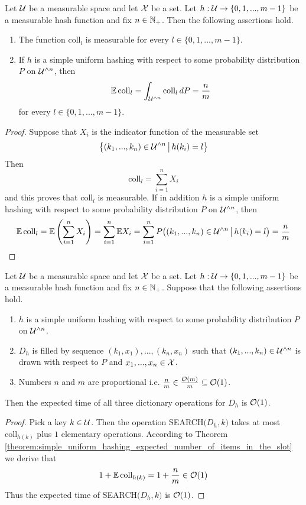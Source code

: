 \begin{theorem}\label{theorem:simple_uniform_hashing_expected_number_of_items_in_the_slot}
Let ${\mathcal U}$ be a measurable space and let ${\mathcal X}$ be a set. Let $h:{\mathcal U}\rightarrow \{0,1,...,m-1\}$ be a measurable hash function and fix $n\in {\mathbb N}_+$. Then the following assertions hold.
\begin{enumerate}[label=\emph{\textbf{(\arabic*)}}, leftmargin=*]
\item The function $\mathrm{coll}_l$ is measurable for every $l\in \{0,1,...,m-1\}$.
\item If $h$ is a simple uniform hashing with respect to some probability distribution $P$ on ${\mathcal U}^{\wedge n}$, then
$$\mathbb{E}\,\mathrm{coll}_l = \int_{{\mathcal U}^{\wedge n}}\mathrm{coll}_l\,dP = \frac{n}{m}$$
for every $l\in \{0,1,...,m-1\}$.
\end{enumerate}
\end{theorem}
\begin{proof}
Suppose that $X_i$ is the indicator function of the measurable set 
$$\big\{(k_1,...,k_n)\in {\mathcal U}^{\wedge n}\,\big|\,h(k_i) = l\big\}$$
Then
$$\mathrm{coll}_l = \sum_{i=1}^nX_i$$
and this proves that $\mathrm{coll}_l$ is measurable. If in addition $h$ is a simple uniform hashing with respect to some probability distribution $P$ on ${\mathcal U}^{\wedge n}$, then
$$\mathbb{E}\,\mathrm{coll}_l = \mathbb{E}\left(\sum_{i=1}^nX_i\right) = \sum_{i=1}^n\mathbb{E}X_i = \sum_{i=1}^nP\big((k_1,...,k_n)\in {\mathcal U}^{\wedge n}\,\big|\,h(k_i) = l\big) = \frac{n}{m}$$
\end{proof}

\begin{corollary}\label{corollary:hashing_with_chaining_expected_operations_under_simple_uniform_hashing}
Let ${\mathcal U}$ be a measurable space and let ${\mathcal X}$ be a set. Let $h:{\mathcal U}\rightarrow \{0,1,...,m-1\}$ be a measurable hash function and fix $n\in {\mathbb N}_+$. Suppose that the following assertions hold.
\begin{enumerate}[label=\emph{\textbf{(\arabic*)}}, leftmargin=*]
\item $h$ is a simple uniform hashing with respect to some probability distribution $P$ on ${\mathcal U}^{\wedge n}$.
\item $D_h$ is filled by sequence $(k_1,x_1),...,(k_n,x_n)$ such that $(k_1,...,k_n)\in {\mathcal U}^{\wedge n}$ is drawn with respect to $P$ and $x_1,...,x_n\in {\mathcal X}$.
\item Numbers $n$ and $m$ are proportional i.e. $\frac{n}{m} \in \frac{{\mathcal O}(m)}{m}\subseteq {\mathcal O}(1)$.
\end{enumerate}
Then the expected time of all three dictionary operations for $D_h$ is ${\mathcal O}(1)$.
\end{corollary}
\begin{proof}
Pick a key $k\in {\mathcal U}$. Then the operation \textrm{SEARCH}$\big(D_h,k\big)$ takes at most $\mathrm{coll}_{h(k)}$ plus $1$ elementary operations. According to Theorem \ref{theorem:simple_uniform_hashing_expected_number_of_items_in_the_slot} we derive that
$$1 + \mathbb{E}\,\mathrm{coll}_{h(k)} = 1 + \frac{n}{m} \in {\mathcal O}(1)$$
Thus the expected time of \textrm{SEARCH}$\big(D_h,k\big)$ is ${\mathcal O}(1)$.
\end{proof}


